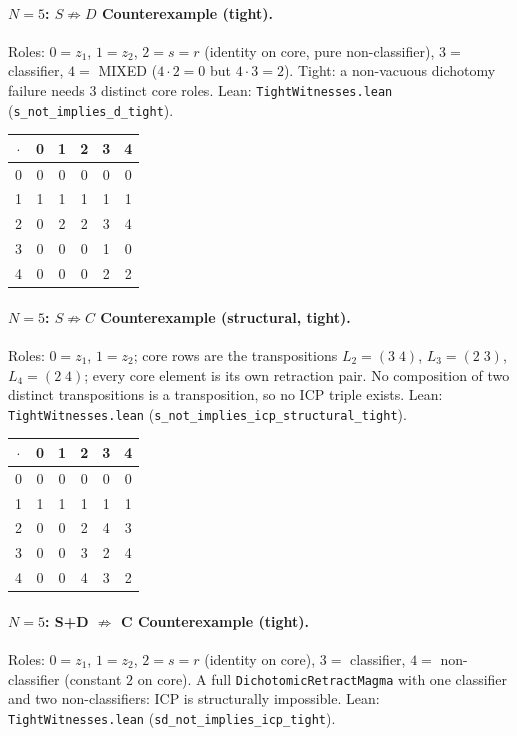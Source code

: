 \documentclass[sigconf,screen]{acmart}
\newcommand{\dotop}{\cdot}
\theoremstyle{remark}
\begin{document}
\paragraph{$N\!=\!5$: $S \not\Rightarrow D$ Counterexample (tight).}
Roles: $0 = z_1$, $1 = z_2$, $2 = s = r$ (identity on core, pure non-classifier), $3 =$ classifier, $4 =$ MIXED ($4 \dotop 2 = 0$ but $4 \dotop 3 = 2$). Tight: a non-vacuous dichotomy failure needs 3 distinct core roles. \quad Lean: \texttt{TightWitnesses.lean} (\texttt{s\_not\_implies\_d\_tight}).

\medskip
{\small
\begin{tabular}{c|ccccc}
$\dotop$ & 0 & 1 & 2 & 3 & 4 \\\hline
0 & 0 & 0 & 0 & 0 & 0 \\
1 & 1 & 1 & 1 & 1 & 1 \\
2 & 0 & 2 & 2 & 3 & 4 \\
3 & 0 & 0 & 0 & 1 & 0 \\
4 & 0 & 0 & 0 & 2 & 2 \\
\end{tabular}}

\paragraph{$N\!=\!5$: $S \not\Rightarrow C$ Counterexample (structural, tight).}
Roles: $0 = z_1$, $1 = z_2$; core rows are the transpositions $L_2 = (3\;4)$, $L_3 = (2\;3)$, $L_4 = (2\;4)$; every core element is its own retraction pair. No composition of two distinct transpositions is a transposition, so no ICP triple exists. \quad Lean: \texttt{TightWitnesses.lean} (\texttt{s\_not\_implies\_icp\_structural\_tight}).

\medskip
{\small
\begin{tabular}{c|ccccc}
$\dotop$ & 0 & 1 & 2 & 3 & 4 \\\hline
0 & 0 & 0 & 0 & 0 & 0 \\
1 & 1 & 1 & 1 & 1 & 1 \\
2 & 0 & 0 & 2 & 4 & 3 \\
3 & 0 & 0 & 3 & 2 & 4 \\
4 & 0 & 0 & 4 & 3 & 2 \\
\end{tabular}}

\paragraph{$N\!=\!5$: S+D $\not\Rightarrow$ C Counterexample (tight).}
Roles: $0 = z_1$, $1 = z_2$, $2 = s = r$ (identity on core), $3 =$ classifier, $4 =$ non-classifier (constant $2$ on core). A full \texttt{DichotomicRetractMagma} with one classifier and two non-classifiers: ICP is structurally impossible. \quad Lean: \texttt{TightWitnesses.lean} (\texttt{sd\_not\_implies\_icp\_tight}).
\end{document}
